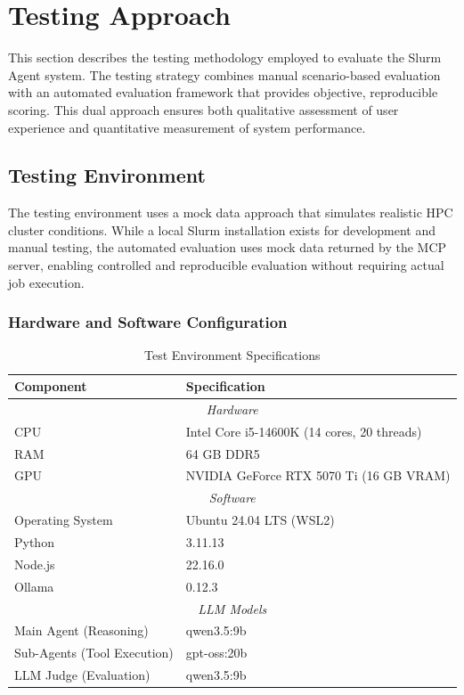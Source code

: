 \section{Testing Approach}
\label{sec:testing-approach}

This section describes the testing methodology employed to evaluate the Slurm Agent system. The testing strategy combines manual scenario-based evaluation with an automated evaluation framework that provides objective, reproducible scoring. This dual approach ensures both qualitative assessment of user experience and quantitative measurement of system performance.

\subsection{Testing Environment}

The testing environment uses a mock data approach that simulates realistic HPC cluster conditions. While a local Slurm installation exists for development and manual testing, the automated evaluation uses mock data returned by the MCP server, enabling controlled and reproducible evaluation without requiring actual job execution.

\subsubsection{Hardware and Software Configuration}

\begin{table}[H]
    \centering
    \caption{Test Environment Specifications}
    \label{tab:test-specs}
    \begin{tabular}{|l|l|}
        \hline
        \textbf{Component} & \textbf{Specification} \\
        \hline
        \multicolumn{2}{|c|}{\textit{Hardware}} \\
        \hline
        CPU & Intel Core i5-14600K (14 cores, 20 threads) \\
        RAM & 64 GB DDR5 \\
        GPU & NVIDIA GeForce RTX 5070 Ti (16 GB VRAM) \\
        \hline
        \multicolumn{2}{|c|}{\textit{Software}} \\
        \hline
        Operating System & Ubuntu 24.04 LTS (WSL2) \\
        Python & 3.11.13 \\
        Node.js & 22.16.0 \\
        Ollama & 0.12.3 \\
        \hline
        \multicolumn{2}{|c|}{\textit{LLM Models}} \\
        \hline
        Main Agent (Reasoning) & qwen3.5:9b \\
        Sub-Agents (Tool Execution) & gpt-oss:20b \\
        LLM Judge (Evaluation) & qwen3.5:9b \\
        \hline
    \end{tabular}
\end{table}

